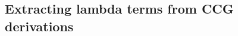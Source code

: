 \documentclass[main.tex]{subfiles}
\begin{document}
\subsection{Extracting lambda terms from CCG derivations}
\end{document}
